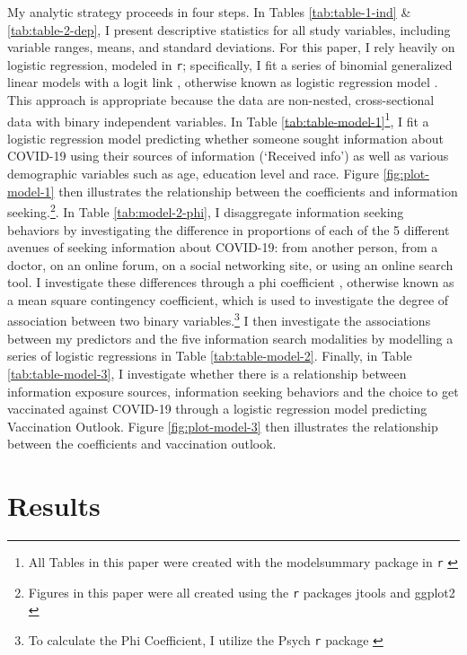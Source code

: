 My analytic strategy proceeds in four steps. In Tables \ref{tab:table-1-ind} \&
\ref{tab:table-2-dep}, I present descriptive statistics for all study variables,
including variable ranges, means, and standard deviations. For this paper, I
rely heavily on logistic regression, modeled in \texttt{r}; specifically, I fit
a series of binomial generalized linear models with a logit link
\citep{venables2002a}, otherwise known as logistic regression model
\citep{hothorn2006handbook}. This approach is appropriate because the data are
non-nested, cross-sectional data with binary independent variables. In Table
\ref{tab:table-model-1}\footnote{All Tables in this paper were created with the
modelsummary package in \texttt{r} \citep{modelsummary}}, I fit a logistic
regression model predicting whether someone sought information about COVID-19
using their sources of information (`Received info') as well as various
demographic variables such as age, education level and race. Figure
\ref{fig:plot-model-1} then illustrates the relationship between the
coefficients and information seeking.\footnote{Figures in this paper were all
created using the \texttt{r} packages jtools \citep{jtools} and ggplot2
\citep{wickham_etal, wickham11}}. In Table \ref{tab:model-2-phi}, I disaggregate
information seeking behaviors by investigating the difference in proportions of
each of the 5 different avenues of seeking information about COVID-19: from
another person, from a doctor, on an online forum, on a social networking site,
or using an online search tool. I investigate these differences through a phi
coefficient \citep{warrens08}, otherwise known as a mean square contingency
coefficient, which is used to investigate the degree of association between two
binary variables.\footnote{To calculate the Phi Coefficient, I utilize the Psych
\texttt{r} package \citep{psych}} I then investigate the associations between my
predictors and the five information search modalities by modelling a series of
logistic regressions in Table \ref{tab:table-model-2}. Finally, in Table
\ref{tab:table-model-3}, I investigate whether there is a relationship between
information exposure sources, information seeking behaviors and the choice to
get vaccinated against COVID-19 through a logistic regression model predicting
Vaccination Outlook. Figure \ref{fig:plot-model-3} then illustrates the
relationship between the coefficients and vaccination outlook.

\hypertarget{results}{\section{Results}\label{results}}

